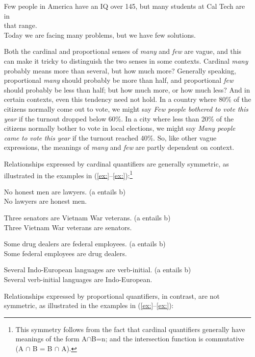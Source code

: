 \ea
\ea Few people in America have an IQ over 145, but many students at Cal Tech are in\\
  that range.\\
\ex Today we are facing many problems, but we have few solutions.
                       \z
\z


Both the cardinal and proportional senses of \textit{many} and \textit{few} are vague, and this can make it tricky to distinguish the two senses in some contexts. Cardinal \textit{many} probably means more than several, but how much more? Generally speaking, proportional \textit{many} should probably be more than half, and proportional \textit{few} should probably be less than half; but how much more, or how much less? And in certain contexts, even this tendency need not hold. In a country where 80\% of the citizens normally come out to vote, we might say \textit{Few people bothered to vote this year} if the turnout dropped below 60\%. In a city where less than 20\% of the citizens normally bother to vote in local elections, we might say \textit{Many people came to vote this year} if the turnout reached 40\%. So, like other vague expressions, the meanings of \textit{many} and \textit{few} are partly dependent on context.



Relationships expressed by cardinal quantifiers are generally symmetric, as illustrated in the examples in (\ref{ex:}--\ref{ex:}):\footnote{This symmetry follows from the fact that cardinal quantifiers generally have meanings of the form {\textbar}A${\cap}$B{\textbar}=n; and the intersection function is commutative (A ${\cap}$ B = B ${\cap}$ A).}


\ea
\ea No honest men are lawyers.   (a entails b)\\
\ex No lawyers are honest men.
                       \z
\z

\ea
\ea Three senators are Vietnam War veterans.   (a entails b)\\
\ex Three Vietnam War veterans are senators.
\z \z

\ea
\ea Some drug dealers are federal employees.   (a entails b)\\
\ex Some federal employees are drug dealers.
\z \z

\ea
\ea Several Indo-European languages are verb-initial.   (a entails b)\\
\ex Several verb-initial languages are Indo-European.
                       \z
\z


Relationships expressed by proportional quantifiers, in contrast, are not symmetric, as illustrated in the examples in (\ref{ex:}--\ref{ex:}):


